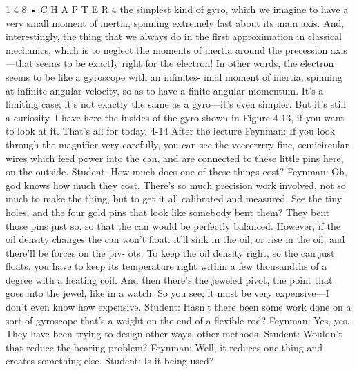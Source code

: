 \documentclass[10pt,oneside]{article}
\begin{document}
1 4 8 • C H A P T E R  4 the simplest kind of gyro, which we imagine to have a very small moment of inertia, spinning extremely fast about its main axis. And, interestingly, the thing that we always do in the first approximation in classical mechanics, which is to neglect the moments of inertia around the precession axis---that seems to be exactly right for the electron! In other words, the electron seems to be like a gyroscope with an infinites- imal moment of inertia, spinning at infinite angular velocity, so as to have a finite angular momentum. It’s a limiting case; it’s not exactly the same as a gyro---it’s even simpler. But it’s still a curiosity. I have here the insides of the gyro shown in Figure 4-13, if you want to look at it. That’s all for today. 4-14 After the lecture Feynman: If you look through the magnifier very carefully, you can see the veeeerrrry fine, semicircular wires which feed power into the can, and are connected to these little pins here, on the outside. Student: How much does one of these things cost? Feynman: Oh, god knows how much they cost. There’s so much precision work involved, not so much to make the thing, but to get it all calibrated and measured. See the tiny holes, and the four gold pins that look like somebody bent them? They bent those pins just so, so that the can would be perfectly balanced. However, if the oil density changes the can won’t float: it’ll sink in the oil, or rise in the oil, and there’ll be forces on the piv- ots. To keep the oil density right, so the can just floats, you have to keep its temperature right within a few thousandths of a degree with a heating coil. And then there’s the jeweled pivot, the point that goes into the jewel, like in a watch. So you see, it must be very expensive---I don’t even know how expensive. Student: Hasn’t there been some work done on a sort of gyroscope that’s a weight on the end of a flexible rod? Feynman: Yes, yes. They have been trying to design other ways, other methods. Student: Wouldn’t that reduce the bearing problem? Feynman: Well, it reduces one thing and creates something else. Student: Is it being used?\par
\end{document}

